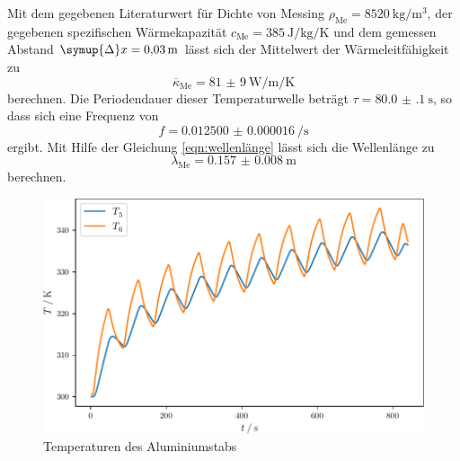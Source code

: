 Mit dem gegebenen Literaturwert für Dichte von Messing $\rho_\text{Me} = \SI{8520}{\kilogram\per\meter\cubed}$, der gegebenen spezifischen Wärmekapazität 
$c_\text{Me} = \SI{385}{\joule\per\kilogram\per\kelvin}$ und dem gemessen Abstand $\symup{\Delta} x = \SI{0.03}{\meter}$ lässt sich der Mittelwert 
der Wärmeleitfähigkeit zu
\begin{equation}
\overline{\kappa}_\text{Me} = \SI{81(9)}{\watt\per\metre\per\kelvin}
\label{eqn:frequenz}
\end{equation}
berechnen. Die Periodendauer dieser Temperaturwelle beträgt $\tau = \SI{80.0(1)}{\second}$, so dass sich eine Frequenz von
\begin{equation}
  f = \SI{0.012500(16)}{\per\second}
\end{equation}
ergibt. Mit Hilfe der Gleichung \eqref{eqn:wellenlänge}
lässt sich die Wellenlänge zu 
\begin{equation}
  \lambda_\text{Me} = \SI{0.157(8)}{\metre}
\end{equation}
berechnen.
\begin{figure}
  \caption{Temperaturen des Aluminiumstabs}
  \centering
  \includegraphics[width = \textwidth]{build/Al.pdf}
\end{figure}
